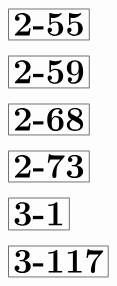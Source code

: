 \documentclass[a4paper, 10pt]{article}
\begin{document}
\begin{minipage}[t]{0.15\textwidth}
                \vspace*{-3.5cm}
        \hspace*{0.75cm}
        $\boxed{\textbf{\Huge2-55}}$
\end{minipage}
\begin{minipage}[t]{0.85\textwidth}
    
\end{minipage}

\begin{minipage}[t]{0.15\textwidth}
                \vspace*{-3.5cm}
        \hspace*{0.75cm}
        $\boxed{\textbf{\Huge2-59}}$
\end{minipage}
\begin{minipage}[t]{0.85\textwidth}
    
\end{minipage}

\begin{minipage}[t]{0.15\textwidth}
                \vspace*{-3.5cm}
        \hspace*{0.75cm}
        $\boxed{\textbf{\Huge2-68}}$
\end{minipage}
\begin{minipage}[t]{0.85\textwidth}
    
\end{minipage}

\begin{minipage}[t]{0.15\textwidth}
                \vspace*{-3.5cm}
        \hspace*{0.75cm}
        $\boxed{\textbf{\Huge2-73}}$
\end{minipage}
\begin{minipage}[t]{0.85\textwidth}
    
\end{minipage}

\begin{minipage}[t]{0.15\textwidth}
                \vspace*{-3.5cm}
        \hspace*{1.25cm}
        $\boxed{\textbf{\Huge3-1}}$
\end{minipage}
\begin{minipage}[t]{0.85\textwidth}
    
\end{minipage}

\begin{minipage}[t]{0.15\textwidth}
                \vspace*{-3.5cm}
        \hspace*{0.25cm}
        $\boxed{\textbf{\Huge3-117}}$
\end{minipage}
\begin{minipage}[t]{0.85\textwidth}
    
\end{minipage}
\end{document}
